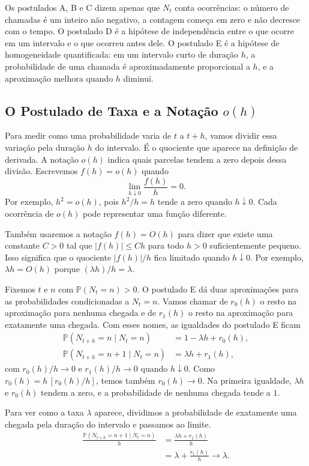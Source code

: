\documentclass[12pt,portuguese]{article}
\theoremstyle{definition}
\theoremstyle{plainexercise}
\theoremstyle{starredexercise}
\theoremstyle{definition}
\begin{document}
Os postulados A, B e C dizem apenas que $N_t$ conta ocorrências: o número de
chamadas é um inteiro não negativo, a contagem começa em zero e não decresce
com o tempo. O postulado D é a hipótese de independência entre o que ocorre em
um intervalo e o que ocorreu antes dele. O postulado E é a hipótese de
homogeneidade quantificada: em um intervalo curto de duração $h$, a
probabilidade de uma chamada é aproximadamente proporcional a $h$, e a
aproximação melhora quando $h$ diminui.

\subsection{O Postulado de Taxa e a Notação \texorpdfstring{$o(h)$}{o(h)}}
\label{subsec:taxa-o-h}

Para medir como uma probabilidade varia de $t$ a $t+h$, vamos dividir
essa variação pela duração $h$ do intervalo. É o quociente que aparece
na definição de derivada. A notação $o(h)$ indica quais parcelas tendem
a zero depois dessa divisão. Escrevemos $f(h)=o(h)$ quando
\[
  \lim_{h\downarrow0}\frac{f(h)}{h}=0.
\]
Por exemplo, $h^2=o(h)$, pois $h^2/h=h$ tende a zero quando $h\downarrow0$.
Cada ocorrência de $o(h)$ pode representar uma função diferente.

Também usaremos a notação $f(h)=O(h)$ para dizer que existe uma constante
$C>0$ tal que $|f(h)|\leqslant Ch$ para todo $h>0$ suficientemente pequeno.
Isso significa que o quociente $|f(h)|/h$ fica limitado quando $h\downarrow0$.
Por exemplo, $\lambda h=O(h)$ porque $(\lambda h)/h=\lambda$.

Fixemos $t$ e $n$ com $\mathbb{P}(N_t=n)>0$. O postulado E dá duas
aproximações para as probabilidades condicionadas a $N_t=n$. Vamos chamar
de $r_0(h)$ o resto na aproximação para nenhuma chegada e de $r_1(h)$ o
resto na aproximação para exatamente uma chegada. Com esses nomes, as
igualdades do postulado E ficam
\begin{align*}
  \mathbb{P}(N_{t+h}=n\mid N_t=n)&=1-\lambda h+r_0(h),\\
  \mathbb{P}(N_{t+h}=n+1\mid N_t=n)&=\lambda h+r_1(h),
\end{align*}
com $r_0(h)/h\to0$ e $r_1(h)/h\to0$ quando $h\downarrow0$. Como
$r_0(h)=h\,[r_0(h)/h]$, temos também $r_0(h)\to0$. Na primeira igualdade,
$\lambda h$ e $r_0(h)$ tendem a zero, e a probabilidade de nenhuma chegada
tende a $1$.

Para ver como a taxa $\lambda$ aparece, dividimos a probabilidade de
exatamente uma chegada pela duração do intervalo e passamos ao limite.
\begin{align*}
  \frac{\mathbb{P}(N_{t+h}=n+1\mid N_t=n)}{h}
  &=\frac{\lambda h+r_1(h)}{h}\\
  &=\lambda+\frac{r_1(h)}{h}
  \longrightarrow\lambda.
\end{align*}
\end{document}
